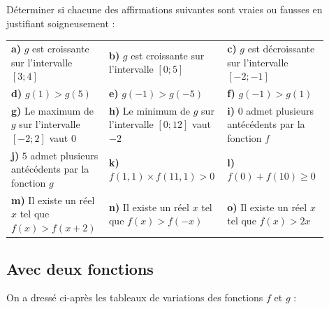 \documentclass[oneside,12pt]{article}          %
\begin{document}
Déterminer si chacune des affirmations suivantes sont vraies ou fausses en justifiant soigneusement :

\renewcommand{\arraystretch}{1.75}
\begin{tabular}{P{0.3\linewidth} P{0.3\linewidth} P{0.3\linewidth}}
	\textbf{a)} $g$ est croissante sur l'intervalle $[3;4]$ &
	\textbf{b)} $g$ est croissante sur l'intervalle $[0;5]$ &
	\textbf{c)} $g$ est décroissante sur l'intervalle $[-2;-1]$ \\
	\textbf{d)} $g(1) > g(5)$ &
	\textbf{e)} $g(-1) > g(-5)$ &
	\textbf{f)} $g(-1) > g(1)$ \\
	\textbf{g)} Le maximum de $g$ sur l'intervalle $[-2;2]$ vaut $0$ &
	\textbf{h)} Le minimum de $g$ sur l'intervalle $[0;12]$ vaut $-2$ & 
	\textbf{i)} $0$ admet plusieurs antécédents par la fonction $f$ \\
	\textbf{j)} $5$ admet plusieurs antécédents par la fonction $g$ &
	\textbf{k)} $f(1,1) \times f(11,1) >0$ &
	\textbf{l)} $f(0)+f(10) \geq 0$ \\
	\textbf{m)} Il existe un réel $x$ tel que $f(x)>f(x+2)$ &
	\textbf{n)} Il existe un réel  $x$ tel que $f(x)>f(-x)$ &
	\textbf{o)} Il existe un réel  $x$ tel que $f(x)>2x$
\end{tabular}



\subsection{Avec deux fonctions}
On a dressé ci-après les tableaux de variations des fonctions $f$ et $g$ :
\end{document}
